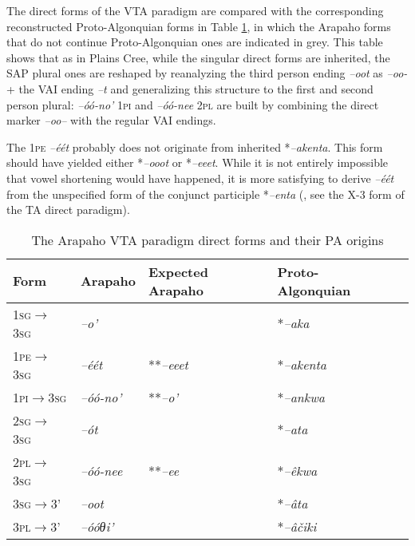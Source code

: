 \documentclass[twoside,a4paper,11pt]{article}
\newcommand{\ipa}[1]{{\phon\textit{#1}}}
\newcommand{\sg}{\textsc{sg}}
\newcommand{\pl}{\textsc{pl}}
\newcommand{\grise}[1]{\cellcolor{lightgray}\textbf{#1}}
\newcommand{\Σ}{\greek{Σ}}
\newcommand{\pli}{\textsc{pi}}
\newcommand{\pe}{\textsc{pe}}
\begin{document}
The direct forms of the VTA paradigm are compared with the corresponding reconstructed Proto-Algonquian forms in Table \ref{tab:arapaho.vta.1}, in which the Arapaho forms that do not continue Proto-Algonquian ones are indicated in grey. This table shows that as in Plains Cree, while the singular direct forms are inherited, the SAP plural ones are reshaped by reanalyzing the third person ending \ipa{--oot} as \ipa{--oo-} + the VAI ending \ipa{--t} and generalizing this structure to the first and second person plural: \ipa{--óó-no'} 1\pli{} and \ipa{--óó-nee} 2\pl{} are built by combining the direct marker \ipa{--oo--} with the regular VAI endings.

The 1\pe{} \ipa{--éét} probably does not originate from inherited  *\ipa{--akenta}. This form should have yielded  either *\ipa{--ooot} or *\ipa{--eeet}. While it is not entirely impossible that vowel shortening would have happened, it is more satisfying to derive  \ipa{--éét}  from the unspecified form of the conjunct participle  *\ipa{--enta} (\citealt[4]{goddard98morphology.arapaho}, see the X-3 form of the TA direct paradigm).

\begin{table}[H]
\caption{The Arapaho VTA paradigm direct forms and their PA origins}
\centering \label{tab:arapaho.vta.1}
\begin{tabular}{lllll}
\toprule
Form& Arapaho & Expected Arapaho & Proto-Algonquian \\
\midrule
 1\sg{}$\rightarrow$3\sg{} & 	\ipa{--o'} & 	 & 	*\ipa{--aka} & 		\\		
1\pe{}$\rightarrow$3\sg{} & 	\ipa{--éét}\grise{} & 	**\ipa{--eeet}&  *\ipa{--akenta} & 		\\		
1\pli{}$\rightarrow$3\sg{} & 	\ipa{--óó-no'}\grise{} & 	**\ipa{--o'}& *\ipa{--ankwa} & 		\\		
\midrule
2\sg{}$\rightarrow$3\sg{} & 	\ipa{--ót} && 	*\ipa{--ata} & 		\\		
2\pl{}$\rightarrow$3\sg{} & 	\ipa{--óó-nee} \grise{}& 	**\ipa{--ee}& *\ipa{--êkwa} & 		\\		
\midrule
3\sg{}$\rightarrow$3' & 	\ipa{--oot} & 	&*\ipa{--âta} & 		\\		
3\pl{}$\rightarrow$3' & 	\ipa{--óóθi'} & &	*\ipa{--âčiki} & 		\\		
\bottomrule
\end{tabular}
\end{table}
\end{document}
